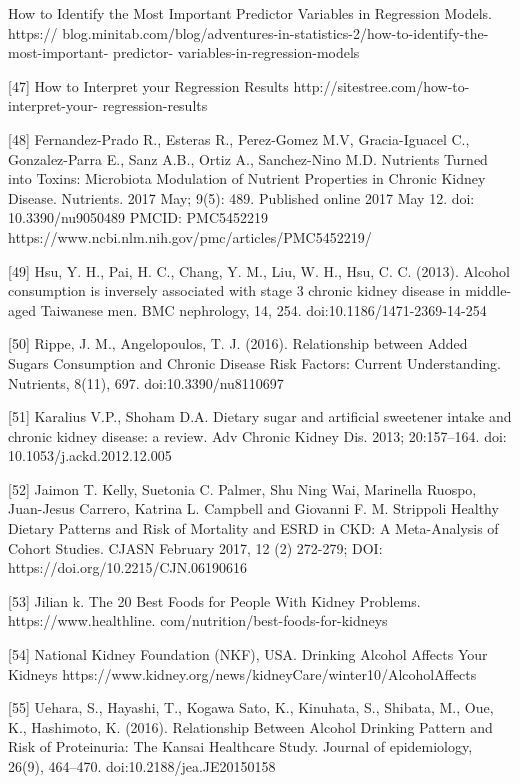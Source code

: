\begin{flushleft}
[46]	How to Identify the Most Important Predictor Variables in Regression Models. https://
blog.minitab.com/blog/adventures-in-statistics-2/how-to-identify-the-most-important-
predictor- variables-in-regression-models

[47]	How to Interpret your Regression Results http://sitestree.com/how-to-interpret-your- 
regression-results

[48]  Fernandez-Prado R., Esteras R., Perez-Gomez M.V, Gracia-Iguacel C., Gonzalez-Parra E.,  Sanz A.B., Ortiz A., Sanchez-Nino M.D. Nutrients Turned into Toxins: Microbiota Modulation of Nutrient Properties in Chronic Kidney Disease. Nutrients. 2017 May; 9(5): 489. Published online 2017 May 12. doi: 10.3390/nu9050489 PMCID: PMC5452219 https://www.ncbi.nlm.nih.gov/pmc/articles/PMC5452219/

[49]  Hsu, Y. H., Pai, H. C., Chang, Y. M., Liu, W. H.,  Hsu, C. C. (2013). Alcohol consumption is inversely associated with stage 3 chronic kidney disease in middle-aged Taiwanese men. BMC nephrology, 14, 254. doi:10.1186/1471-2369-14-254

[50]  Rippe, J. M.,  Angelopoulos, T. J. (2016). Relationship between Added Sugars Consumption and Chronic Disease Risk Factors: Current Understanding. Nutrients, 8(11), 697. doi:10.3390/nu8110697

[51]  Karalius V.P., Shoham D.A. Dietary sugar and artificial sweetener intake and chronic kidney disease: a review. Adv Chronic Kidney Dis. 2013; 20:157–164. doi: 10.1053/j.ackd.2012.12.005

[52] Jaimon T. Kelly, Suetonia C. Palmer, Shu Ning Wai, Marinella Ruospo, Juan-Jesus Carrero, Katrina L. Campbell and Giovanni F. M. Strippoli Healthy Dietary Patterns and Risk of Mortality and ESRD in CKD: A Meta-Analysis of Cohort Studies. CJASN February 2017, 12 (2) 272-279; DOI: https://doi.org/10.2215/CJN.06190616 

[53]  Jilian k. The 20 Best Foods for People With Kidney Problems. https://www.healthline.
com/nutrition/best-foods-for-kidneys

[54]  National Kidney Foundation (NKF), USA. Drinking Alcohol Affects Your Kidneys https://www.kidney.org/news/kidneyCare/winter10/AlcoholAffects

[55]  Uehara, S., Hayashi, T., Kogawa Sato, K., Kinuhata, S., Shibata, M., Oue, K., Hashimoto, K. (2016). Relationship Between Alcohol Drinking Pattern and Risk of Proteinuria: The Kansai Healthcare Study. Journal of epidemiology, 26(9), 464–470. doi:10.2188/jea.JE20150158


\end{flushleft}

